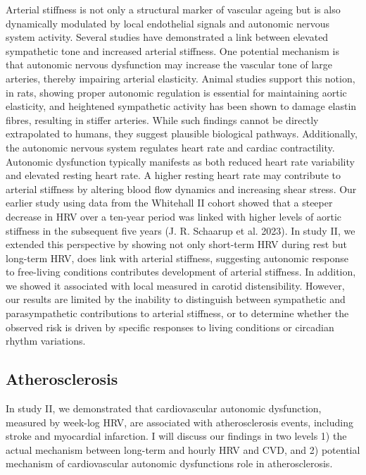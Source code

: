 \documentclass[
  a4paper,
  headsepline=true,
  open=any]{scrbook}
\begin{document}
Arterial stiffness is not only a structural marker of vascular ageing
but is also dynamically modulated by local endothelial signals and
autonomic nervous system activity. Several studies have demonstrated a
link between elevated sympathetic tone and increased arterial stiffness.
One potential mechanism is that autonomic nervous dysfunction may
increase the vascular tone of large arteries, thereby impairing arterial
elasticity. Animal studies support this notion, in rats, showing proper
autonomic regulation is essential for maintaining aortic elasticity, and
heightened sympathetic activity has been shown to damage elastin fibres,
resulting in stiffer arteries. While such findings cannot be directly
extrapolated to humans, they suggest plausible biological pathways.
Additionally, the autonomic nervous system regulates heart rate and
cardiac contractility. Autonomic dysfunction typically manifests as both
reduced heart rate variability and elevated resting heart rate. A higher
resting heart rate may contribute to arterial stiffness by altering
blood flow dynamics and increasing shear stress. Our earlier study using
data from the Whitehall II cohort showed that a steeper decrease in HRV
over a ten-year period was linked with higher levels of aortic stiffness
in the subsequent five years (J. R. Schaarup et al. 2023). In study II,
we extended this perspective by showing not only short-term HRV during
rest but long-term HRV, does link with arterial stiffness, suggesting
autonomic response to free-living conditions contributes development of
arterial stiffness. In addition, we showed it associated with local
measured in carotid distensibility. However, our results are limited by
the inability to distinguish between sympathetic and parasympathetic
contributions to arterial stiffness, or to determine whether the
observed risk is driven by specific responses to living conditions or
circadian rhythm variations.

\hypertarget{atherosclerosis-1}{%
\subsection{Atherosclerosis}\label{atherosclerosis-1}}

In study II, we demonstrated that cardiovascular autonomic dysfunction,
measured by week-log HRV, are associated with atherosclerosis events,
including stroke and myocardial infarction. I will discuss our findings
in two levels 1) the actual mechanism between long-term and hourly HRV
and CVD, and 2) potential mechanism of cardiovascular autonomic
dysfunctions role in atherosclerosis.
\end{document}
